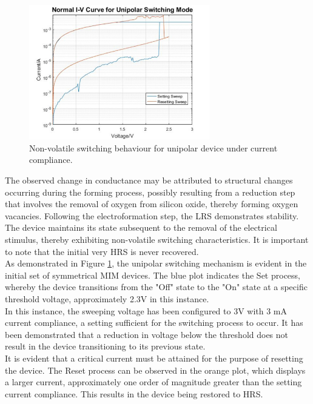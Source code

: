 \begin{figure}[htbp!] 
    \centering    
    \includegraphics[width=0.7\textwidth]{Chapter3/Figs/h.png}
    \caption[Non-volatile switching behaviour for unipolar device under current compliance.]{Non-volatile switching behaviour for unipolar device under current compliance.}
    \label{fig:3h}
\end{figure}

\noindent The observed change in conductance may be attributed to structural changes occurring during the forming process, possibly resulting from a reduction step that involves the removal of oxygen from silicon oxide, thereby forming oxygen vacancies. Following the electroformation step, the LRS demonstrates stability. The device maintains its state subsequent to the removal of the electrical stimulus, thereby exhibiting non-volatile switching characteristics. It is important to note that the initial very HRS is never recovered. \\

\noindent As demonstrated in Figure \ref{fig:3h}, the unipolar switching mechanism is evident in the initial set of symmetrical MIM devices. The blue plot indicates the Set process, whereby the device transitions from the "Off" state to the "On" state at a specific threshold voltage, approximately 2.3V in this instance. \\

\noindent In this instance, the sweeping voltage has been configured to 3V with 3 mA current compliance, a setting sufficient for the switching process to occur. It has been demonstrated that a reduction in voltage below the threshold does not result in the device transitioning to its previous state.\\

\noindent It is evident that a critical current must be attained for the purpose of resetting the device. The Reset process can be observed in the orange plot, which displays a larger current, approximately one order of magnitude greater than the setting current compliance. This results in the device being restored to HRS. \\

